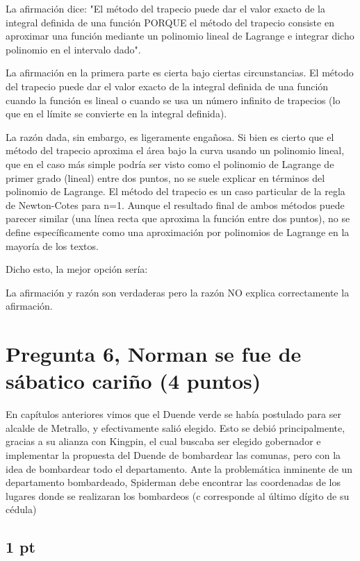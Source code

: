 La afirmación dice: "El método del trapecio puede dar el valor exacto de la integral definida de una función PORQUE el método del trapecio consiste en aproximar una función mediante un polinomio lineal de Lagrange e integrar dicho polinomio en el intervalo dado".

La afirmación en la primera parte es cierta bajo ciertas circunstancias. El método del trapecio puede dar el valor exacto de la integral definida de una función cuando la función es lineal o cuando se usa un número infinito de trapecios (lo que en el límite se convierte en la integral definida).

La razón dada, sin embargo, es ligeramente engañosa. Si bien es cierto que el método del trapecio aproxima el área bajo la curva usando un polinomio lineal, que en el caso más simple podría ser visto como el polinomio de Lagrange de primer grado (lineal) entre dos puntos, no se suele explicar en términos del polinomio de Lagrange. El método del trapecio es un caso particular de la regla de Newton-Cotes para n=1. Aunque el resultado final de ambos métodos puede parecer similar (una línea recta que aproxima la función entre dos puntos), no se define específicamente como una aproximación por polinomios de Lagrange en la mayoría de los textos.

Dicho esto, la mejor opción sería:

La afirmación y razón son verdaderas pero la razón NO explica correctamente la afirmación.

\section{Pregunta 6, Norman se fue de sábatico cariño (4 puntos)}

En capítulos anteriores vimos que el Duende verde se había postulado para ser alcalde de Metrallo, y efectivamente salió elegido. Esto se debió principalmente, gracias  a su alianza con Kingpin, el cual buscaba ser elegido gobernador e implementar la propuesta del Duende de bombardear las comunas, pero con la idea de bombardear todo el departamento. Ante la problemática inminente de un departamento bombardeado, Spiderman debe encontrar las coordenadas de los lugares donde se realizaran los bombardeos (c corresponde al último dígito de su cédula)

\subsection{1 pt}

